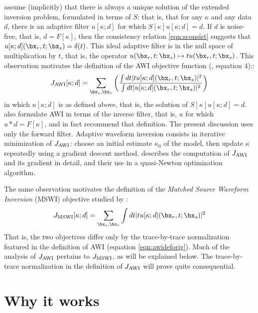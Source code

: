 \cite{Warner:16} assume (implicitly) that there is always a unique
solution of the extended inversion problem, formulated in terms of
$S$: that is, that
for any $\kappa$ and any data $d$, there is an
adaptive filter $u[\kappa;d]$ for which
$S[\kappa]u[\kappa;d]= d$. If $d$ is noise-free, that is, $d=F[\kappa]$, then the consistency relation \ref{eqn:sconsist}
suggests that $u[\kappa;d](\bx_r,t;\bx_s) = \delta(t)$. This ideal adaptive filter is in the null
space of multiplication by $t$, that is, the operator
$u(\bx_r,t;\bx_s) \mapsto t u(\bx_r,t;\bx_s)$. This
observation motivates the definition of the AWI objective function
(\cite{Warner:16}, equation 4)::
\begin{equation}
  \label{eqn:awideforig}
  J_{\rm AWI}[\kappa;d] = \sum_{\bx_s,\bx_r} \left(\frac{\int dt |tu[\kappa;d](\bx_r,t;\bx_s)|^2}{\int dt |u[\kappa;d](\bx_r,t;\bx_s)|^2}\right) 
\end{equation}
in which $u[\kappa;d]$ is as defined above, that is, the solution of $S[\kappa]u[\kappa;d]
= d$. \cite{Warner:16} also formulate
AWI in terms of the inverse filter, that is, $u$ for which
$u*d = F[\kappa]$, and in fact recommend that definition. The present
discussion uses only the forward filter.
Adaptive waveform inversion consists in iterative minimization of
$J_{\rm AWI}$: choose an initial estimate $\kappa_0$ of the
model, then update $\kappa$ repeatedly using a gradient
descent method. \cite{Warner:16} describes the computation of $J_{\rm AWI}$
and its gradient in detail, and their use in a quasi-Newton
optimization algorithm.

The same observation motivates the definition of the {\em Matched
  Source Waveform Inversion} (MSWI) objective studied by
\cite{HuangSymes2015SEG,HuangSymes:Geo17}:
\begin{equation}
  \label{eqn:mswideforig}
  J_{\rm MSWI}[\kappa;d] = \sum_{\bx_s,\bx_r} \int dt |tu[\kappa;d](\bx_r,t;\bx_s)|^2
\end{equation}
That is, the two objectives differ only by the trace-by-trace
normalization featured in the definition of AWI (equation
\ref{eqn:awideforig}). Much of the analysis of $J_{\rm AWI}$ pertains to
$J_{\rm MSWI}$, as will be explained below.
The trace-by-trace normalization in the definition of $J_{\rm AWI}$
will prove quite consequential.

\section{Why it works}

